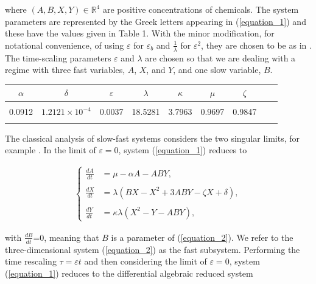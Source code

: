 \documentclass{ws-ijbc}
\begin{document}
\noindent
where $(A, B, X, Y)\in\mathbb{R}^{4}$ are positive concentrations of chemicals.  The system parameters are represented by the Greek letters appearing in (\ref{equation_1}) and these have the values given in Table 1.  With the minor modification, for notational convenience, of using $\varepsilon$ for $\varepsilon_{b}$ and $\frac{1}{\lambda}$ for $\varepsilon^{2}$, they are chosen to be as in \cite{Rescaling}.  The time-scaling parameters $\varepsilon$ and $\lambda$ are chosen so that we are dealing with a regime with three fast variables, $A$, $X$, and $Y$, and one slow variable, $B$.

\begin{table}[h]
{\begin{tabular}{c  c  c  c  c  c  c  c  c} \\[-2pt]
\toprule
$\alpha$ & $\delta$ & $\varepsilon$ & $\lambda$ & $\kappa$ & $\mu$ & $\zeta$ \\[6pt]
\hline\\[-2pt]
0.0912 & $1.2121 \times 10^{-4}$ & 0.0037 & 18.5281 & 3.7963 & 0.9697 & 0.9847\\[1pt]
\botrule
\end{tabular}}
\end{table}
    
The classical analysis of slow-fast systems considers the two singular limits, for example \cite{MMO}.  In the limit of $\varepsilon = 0$, system (\ref{equation_1}) reduces to
    
\begin{equation}
\begin{aligned}
\begin{cases}
\frac{dA}{dt} &= \mu - \alpha A - ABY, \\ \\
\frac{dX}{dt} &= \lambda(BX - X^2 +3ABY - \zeta X + \delta), \\ \\
\frac{dY}{dt} &= \kappa \lambda(X^2 - Y - ABY),
\end{cases}
\end{aligned}
\label{equation_2}
\end{equation}
    
\noindent
with $\frac{dB}{dt}$=0, meaning that $B$ is a parameter of (\ref{equation_2}).  We refer to the three-dimensional system (\ref{equation_2}) as the fast subsystem.  Performing the time rescaling $\tau = \varepsilon t$ and then considering the limit of $\varepsilon = 0$, system (\ref{equation_1}) reduces to the differential algebraic reduced system
    
\end{document}

